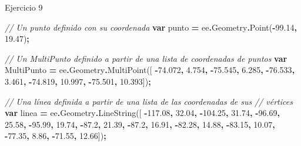\documentclass[
  12pt,
  letterpaper,
  twoside]{book}
\newenvironment{Shaded}{\begin{snugshade}}{\end{snugshade}}
\newcommand{\AttributeTok}[1]{\textcolor[rgb]{0.77,0.63,0.00}{#1}}
\newcommand{\CommentTok}[1]{\textcolor[rgb]{0.56,0.35,0.01}{\textit{#1}}}
\newcommand{\FloatTok}[1]{\textcolor[rgb]{0.00,0.00,0.81}{#1}}
\newcommand{\FunctionTok}[1]{\textcolor[rgb]{0.00,0.00,0.00}{#1}}
\newcommand{\KeywordTok}[1]{\textcolor[rgb]{0.13,0.29,0.53}{\textbf{#1}}}
\newcommand{\NormalTok}[1]{#1}
\newcommand{\OperatorTok}[1]{\textcolor[rgb]{0.81,0.36,0.00}{\textbf{#1}}}
\begin{document}
Ejercicio 9

\begin{Shaded}
\begin{Highlighting}[]
\CommentTok{// Un punto definido con su coordenada  }
\KeywordTok{var}\NormalTok{ punto }\OperatorTok{=}\NormalTok{ ee}\OperatorTok{.}\AttributeTok{Geometry}\OperatorTok{.}\FunctionTok{Point}\NormalTok{(}\OperatorTok{{-}}\FloatTok{99.14}\OperatorTok{,} \FloatTok{19.47}\NormalTok{)}\OperatorTok{;} 

\CommentTok{// Un MultiPunto definido a partir de una lista de coordenadas de puntos}
\KeywordTok{var}\NormalTok{ MultiPunto }\OperatorTok{=}\NormalTok{ ee}\OperatorTok{.}\AttributeTok{Geometry}\OperatorTok{.}\FunctionTok{MultiPoint}\NormalTok{([     }
  \OperatorTok{{-}}\FloatTok{74.072}\OperatorTok{,} \FloatTok{4.754}\OperatorTok{,}                              
  \OperatorTok{{-}}\FloatTok{75.545}\OperatorTok{,} \FloatTok{6.285}\OperatorTok{,}                             
  \OperatorTok{{-}}\FloatTok{76.533}\OperatorTok{,} \FloatTok{3.461}\OperatorTok{,}
  \OperatorTok{{-}}\FloatTok{74.819}\OperatorTok{,} \FloatTok{10.997}\OperatorTok{,}
  \OperatorTok{{-}}\FloatTok{75.501}\OperatorTok{,} \FloatTok{10.393}\NormalTok{])}\OperatorTok{;}

\CommentTok{// Una línea definida a partir de una lista de las coordenadas de sus }
\CommentTok{// vértices}
\KeywordTok{var}\NormalTok{ linea }\OperatorTok{=}\NormalTok{ ee}\OperatorTok{.}\AttributeTok{Geometry}\OperatorTok{.}\FunctionTok{LineString}\NormalTok{([ }
  \OperatorTok{{-}}\FloatTok{117.08}\OperatorTok{,} \FloatTok{32.04}\OperatorTok{,}                    
  \OperatorTok{{-}}\FloatTok{104.25}\OperatorTok{,} \FloatTok{31.74}\OperatorTok{,}                    
  \OperatorTok{{-}}\FloatTok{96.69}\OperatorTok{,} \FloatTok{25.58}\OperatorTok{,}
  \OperatorTok{{-}}\FloatTok{95.99}\OperatorTok{,} \FloatTok{19.74}\OperatorTok{,}
  \OperatorTok{{-}}\FloatTok{87.2}\OperatorTok{,} \FloatTok{21.39}\OperatorTok{,}
  \OperatorTok{{-}}\FloatTok{87.2}\OperatorTok{,} \FloatTok{16.91}\OperatorTok{,}
  \OperatorTok{{-}}\FloatTok{82.28}\OperatorTok{,} \FloatTok{14.88}\OperatorTok{,}
  \OperatorTok{{-}}\FloatTok{83.15}\OperatorTok{,} \FloatTok{10.07}\OperatorTok{,}
  \OperatorTok{{-}}\FloatTok{77.35}\OperatorTok{,} \FloatTok{8.86}\OperatorTok{,}
  \OperatorTok{{-}}\FloatTok{71.55}\OperatorTok{,} \FloatTok{12.66}\NormalTok{])}\OperatorTok{;} 


\end{Highlighting}
\end{Shaded}
\end{document}

